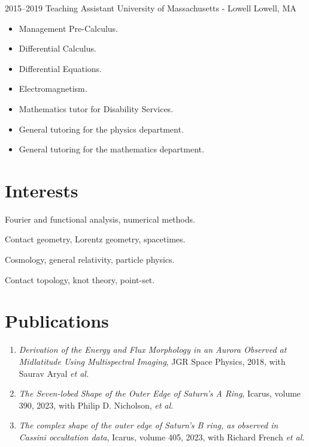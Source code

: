 \documentclass[a4paper,sans]{moderncv}
\begin{document}
        \cventry%
            {2015--2019}
            {Teaching Assistant}
            {University of Massachusetts - Lowell}
            {Lowell, MA}
            {}
            {%
                \begin{itemize}
                    \item
                        Management Pre-Calculus.
                    \item
                        Differential Calculus.
                    \item
                        Differential Equations.
                    \item
                        Electromagnetism.
                    \item
                        Mathematics tutor for Disability Services.
                    \item
                        General tutoring for the physics department.
                    \item
                        General tutoring for the mathematics department.
                \end{itemize}%
            }
    \section{Interests}
            Fourier and functional analysis, numerical methods.\par
            Contact geometry, Lorentz geometry, spacetimes.\par
            Cosmology, general relativity, particle physics.\par
            Contact topology, knot theory, point-set.
    \section{Publications}
        \begin{enumerate}
            \item
                \textit{Derivation of the Energy and Flux Morphology in an
                Aurora Observed at Midlatitude Using Multispectral Imaging},
                JGR Space Physics, 2018, with Saurav Aryal \textit{et al.}
            \item
                \textit{The Seven-lobed Shape of the Outer
                Edge of Saturn’s A Ring}, Icarus, volume 390, 2023, with
                Philip D. Nicholson, \textit{et al.}
            \item
                \textit{The complex shape of the outer edge of Saturn’s B ring,
                as observed in Cassini occultation data},
                Icarus, volume 405, 2023, with Richard French \textit{et al.}
        \end{enumerate}
\end{document}

